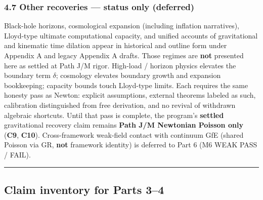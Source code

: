 \documentclass[
  11pt,
]{article}
\begin{document}
\subsubsection{4.7 Other recoveries --- status only
(deferred)}\label{other-recoveries-status-only-deferred}

Black-hole horizons, cosmological expansion (including inflation
narratives), Lloyd-type ultimate computational capacity, and unified
accounts of gravitational and kinematic time dilation appear in
historical and outline form under Appendix A and legacy Appendix A
drafts. Those regimes are \textbf{not} presented here as settled at Path
J/M rigor. High-load / horizon physics elevates the boundary term
\(\delta\); cosmology elevates boundary growth and expansion
bookkeeping; capacity bounds touch Lloyd-type limits. Each requires the
same honesty pass as Newton: explicit assumptions, external theorems
labeled as such, calibration distinguished from free derivation, and no
revival of withdrawn algebraic shortcuts. Until that pass is complete,
the program's \textbf{settled} gravitational recovery claim remains
\textbf{Path J/M Newtonian Poisson only} (\textbf{C9}, \textbf{C10}).
Cross-framework weak-field contact with continuum GfE (shared Poisson
via GR, \textbf{not} framework identity) is deferred to Part 6 (M6 WEAK
PASS / FAIL).

\begin{center}\rule{0.5\linewidth}{0.5pt}\end{center}

\subsection{Claim inventory for Parts
3--4}\label{claim-inventory-for-parts-34}
\end{document}
